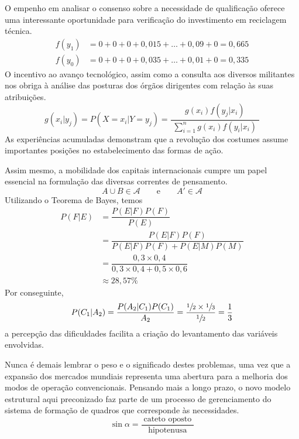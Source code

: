 \documentclass[fleqn]{profmat-cefet}
\begin{document}
O empenho em analisar o consenso sobre a necessidade de qualificação oferece uma
interessante oportunidade para verificação do investimento em reciclagem
técnica. 
\begin{align*}
        f(y_1) & = 0 + 0 + 0 + 0,015 + \dots + 0,09 + 0 = 0,665 \\
        f(y_0) & = 0 + 0 + 0 + 0,035 + \dots + 0,01 + 0 = 0,335
\end{align*}
O incentivo ao avanço tecnológico, assim como a consulta aos diversos militantes nos obriga
à análise das posturas dos órgãos dirigentes com relação às suas atribuições.
\[
   g(x_i|y_j) = P(X=x_i|Y=y_j) = \dfrac{g(x_i) f(y_j|x_i)}{\displaystyle\;\sum_{i=1}^{n} g(x_i) f(y_i|x_i)\;}  
\]
As experiências acumuladas demonstram que a revolução dos costumes
assume importantes posições no estabelecimento das formas de ação. 

Assim mesmo, a mobilidade dos capitais internacionais cumpre um papel essencial
na formulação das diversas correntes de pensamento.
\[ A\cup B \in \mathcal{A} \qquad  \text{e} \qquad  A'\in \mathcal{A} \]
Utilizando o Teorema de Bayes, temos 
\begin{align*}
        P(F|E) & = \dfrac{P(E|F)P(F)}{P(E)}                                \\[3mm]
               & = \dfrac{P(E|F)P(F)}{P(E|F)P(F) + P(E|M)P(M)}             \\[3mm]
               & = \dfrac{0,3 \times 0,4}{0,3 \times 0,4 + 0,5 \times 0,6} \\[3mm]
               & \approx 28,57\%
\end{align*}
Por conseguinte,
\[
    P(C_{1}|A_{2}) = \dfrac{P(A_{2}|C_{1})P(C_{1})}{A_{2}} 
                   = \dfrac{\sfrac{1}{2} \times \sfrac{1}{3}}{\sfrac{1}{2}} 
                   = \frac{1}{3}
\]
a percepção das dificuldades facilita a criação do levantamento
das variáveis envolvidas. 

Nunca é demais lembrar o peso e o significado destes
problemas, uma vez que a expansão dos mercados mundiais representa uma abertura
para a melhoria dos modos de operação convencionais. Pensando mais a longo
prazo, o novo modelo estrutural aqui preconizado faz parte de um processo de
gerenciamento do sistema de formação de quadros que corresponde às necessidades. 
\[
    \sin \alpha = \frac{\;\text{cateto oposto}\;}{\text{hipotenusa}}
\]
\end{document}
